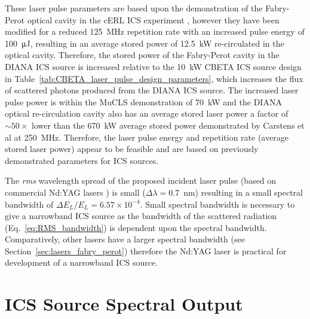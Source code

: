 \documentclass[../main.tex]{subfiles}
\begin{document}
These laser pulse parameters are based upon the demonstration of the Fabry-Perot optical cavity in the cERL ICS experiment \cite{akagi2016narrow}, however they have been modified for a reduced 125~\si{\mega\hertz} repetition rate with an increased pulse energy of 100~\si{\micro\joule}, resulting in an average stored power of 12.5~\si{\kilo\watt} re-circulated in the optical cavity. Therefore, the stored power of the Fabry-Perot cavity in the DIANA ICS source is increased relative to the 10~\si{\kilo\watt} CBETA ICS source design in Table~\ref{tab:CBETA_laser_pulse_design_parameters}, which increases the flux of scattered photons produced from the DIANA ICS source. The increased laser pulse power is within the MuCLS demonstration of 70~\si{\kilo\watt} \cite{eggl2016munich} and the DIANA optical re-circulation cavity also has an average stored laser power a factor of $\sim50\times$ lower than the 670~\si{\kilo\watt} average stored power demonstrated by Carstens et al \cite{carstens2014megawatt} at 250~\si{\mega\hertz}. Therefore, the laser pulse energy and repetition rate (average stored laser power) appear to be feasible and are based on previously demonstrated parameters for ICS sources. 

The \textit{rms} wavelength spread of the proposed incident laser pulse (based on commercial Nd:YAG lasers \cite{thorlabs2021ndyag200}) is small ($\Delta\lambda = 0.7$~\si{\nano\meter}) \cite{corner2019} resulting in a small spectral bandwidth of $\Delta E_{L}/E_{L} = 6.57\times 10^{-4}$. Small spectral bandwidth is necessary to give a narrowband ICS source as the bandwidth of the scattered radiation (Eq.~\ref{eq:RMS_bandwidth}) is dependent upon the spectral bandwidth. Comparatively, other lasers have a larger spectral bandwidth (see Section~\ref{sec:lasers_fabry_perot}) therefore the Nd:YAG laser is practical for development of a narrowband ICS source. 

\section{ICS Source Spectral Output}
\label{sec:DIANA_spectral_output}
\end{document}
